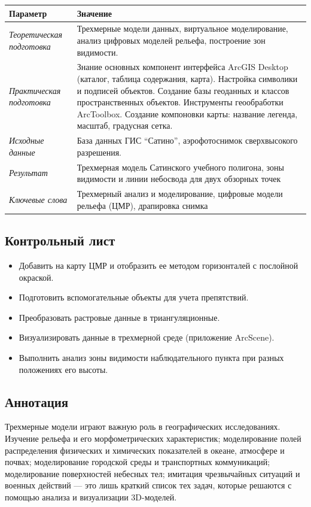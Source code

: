 \documentclass[12pt,]{book}
\providecommand{\tightlist}{%
  \setlength{\itemsep}{0pt}\setlength{\parskip}{0pt}}
\begin{document}
\begin{longtable}[]{@{}ll@{}}
\toprule
Параметр & Значение\tabularnewline
\midrule
\endhead
\emph{Теоретическая подготовка} & Трехмерные модели данных, виртуальное моделирование, анализ цифровых моделей рельефа, построение зон видимости.\tabularnewline
\emph{Практическая подготовка} & Знание основных компонент интерфейса ArcGIS Desktop (каталог, таблица содержания, карта). Настройка символики и подписей объектов. Создание базы геоданных и классов пространственных объектов. Инструменты геообработки ArcToolbox. Создание компоновки карты: название легенда, масштаб, градусная сетка.\tabularnewline
\emph{Исходные данные} & База данных ГИС ``Сатино'', аэрофотоснимок сверхвысокого разрешения.\tabularnewline
\emph{Результат} & Трехмерная модель Сатинского учебного полигона, зоны видимости и линии небосвода для двух обзорных точек\tabularnewline
\emph{Ключевые слова} & Трехмерный анализ и моделирование, цифровые модели рельефа (ЦМР), драпировка снимка\tabularnewline
\bottomrule
\end{longtable}

\hypertarget{threed-modelling-control}{%
\subsection{Контрольный лист}\label{threed-modelling-control}}

\begin{itemize}
\tightlist
\item
  Добавить на карту ЦМР и отобразить ее методом горизонталей с послойной окраской.
\item
  Подготовить вспомогательные объекты для учета препятствий.
\item
  Преобразовать растровые данные в триангуляционные.
\item
  Визуализировать данные в трехмерной среде (приложение ArcScene).
\item
  Выполнить анализ зоны видимости наблюдательного пункта при разных положениях его высоты.
\end{itemize}

\hypertarget{threed-modelling-annotation}{%
\subsection{Аннотация}\label{threed-modelling-annotation}}

Трехмерные модели играют важную роль в географических исследованиях. Изучение рельефа и его морфометрических характеристик; моделирование полей распределения физических и химических показателей в океане, атмосфере и почвах; моделирование городской среды и транспортных коммуникаций; моделирование поверхностей небесных тел; имитация чрезвычайных ситуаций и военных действий --- это лишь краткий список тех задач, которые решаются с помощью анализа и визуализации 3D-моделей.
\end{document}
